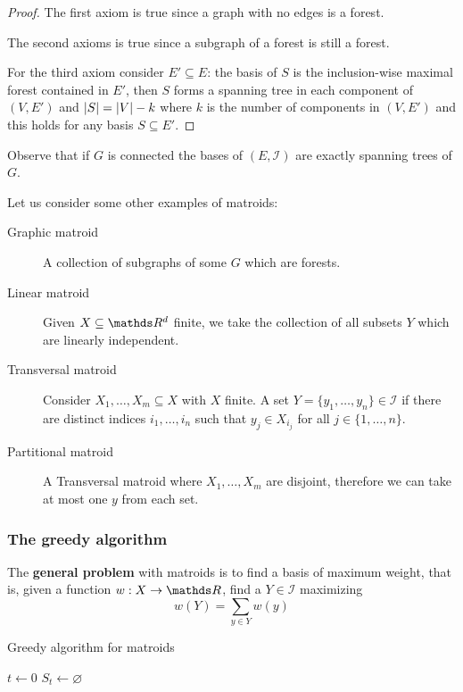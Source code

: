\documentclass[12pt]{extarticle}
\begin{document}
\begin{proof}
	The first axiom is true since a graph with no edges is a forest.

	The second axioms is true since a subgraph of a forest is still a forest.

	For the third axiom consider $E' \subseteq E$: the basis of $S$ is the inclusion-wise maximal
	forest contained in $E'$, then $S$ forms a spanning tree in each component of $(V, E')$ and
	$\abs{S} = \abs{V} - k$ where $k$ is the number of components in $(V, E')$ and this holds for any
	basis $S \subseteq E'$.
\end{proof}

Observe that if $G$ is connected the bases of $(E, \mathcal I)$ are exactly spanning trees of $G$.

Let us consider some other examples of matroids:
\begin{description}
	\item[Graphic matroid] A collection of subgraphs of some $G$ which are forests.
	\item[Linear matroid] Given $X \subseteq \R^d$ finite, we take the collection of all subsets $Y$
	      which are linearly independent.
	\item[Transversal matroid] Consider $X_1, \dots, X_m \subseteq X$ with $X$ finite. A set
	      $Y = \{y_1, \dots, y_n \} \in \mathcal I$ if there are distinct indices $i_1, \dots, i_n$ such
	      that $y_j \in X_{i_j}$ for all $j \in \{1, \dots, n\}$.

	\item[Partitional matroid] A Transversal matroid where $X_1, \dots, X_m$ are disjoint,
	      therefore we can take at most one $y$ from each set.
\end{description}

\subsubsection{The greedy algorithm}

The \textbf{general problem} with matroids is to find a basis of maximum weight, that is, given a
function $w: X \to \R$, find a $Y \in \mathcal I$ maximizing
\begin{equation}
	w(Y) = \sum_{y \in Y} w(y)
\end{equation}

\begin{algorithm}
	\caption{Greedy algorithm for matroids}
	\label{alg:greedy-matroids}

	$t \gets 0$\;
	$S_t \gets \varnothing$\;
\end{algorithm}
\end{document}
